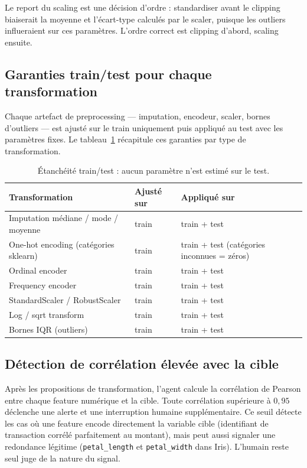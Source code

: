 \documentclass[12pt,a4paper]{article}
\begin{document}
Le report du scaling est une décision d'ordre : standardiser avant le clipping biaiserait
la moyenne et l'écart-type calculés par le scaler, puisque les outliers influeraient sur
ces paramètres. L'ordre correct est clipping d'abord, scaling ensuite.

\subsection{Garanties train/test pour chaque transformation}

Chaque artefact de preprocessing --- imputation, encodeur, scaler, bornes d'outliers ---
est ajusté sur le train uniquement puis appliqué au test avec les paramètres fixes.
Le tableau~\ref{tab:leakage} récapitule ces garanties par type de transformation.

\begin{table}[H]
\centering
\begin{tabular}{lll}
\toprule
\textbf{Transformation} & \textbf{Ajusté sur} & \textbf{Appliqué sur} \\
\midrule
Imputation médiane / mode / moyenne & train & train + test \\
One-hot encoding (catégories sklearn) & train & train + test (catégories inconnues = zéros) \\
Ordinal encoder & train & train + test \\
Frequency encoder & train & train + test \\
StandardScaler / RobustScaler & train & train + test \\
Log / sqrt transform & train & train + test \\
Bornes IQR (outliers) & train & train + test \\
\bottomrule
\end{tabular}
\caption{Étanchéité train/test : aucun paramètre n'est estimé sur le test.}
\label{tab:leakage}
\end{table}

\subsection{Détection de corrélation élevée avec la cible}

Après les propositions de transformation, l'agent calcule la corrélation de Pearson
entre chaque feature numérique et la cible. Toute corrélation supérieure à $0{,}95$
déclenche une alerte et une interruption humaine supplémentaire. Ce seuil détecte les
cas où une feature encode directement la variable cible (identifiant de transaction
corrélé parfaitement au montant), mais peut aussi signaler une redondance légitime
(\texttt{petal\_length} et \texttt{petal\_width} dans Iris). L'humain reste seul juge
de la nature du signal.
\end{document}

